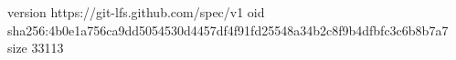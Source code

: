version https://git-lfs.github.com/spec/v1
oid sha256:4b0e1a756ca9dd5054530d4457df4f91fd25548a34b2c8f9b4dfbfc3c6b8b7a7
size 33113
